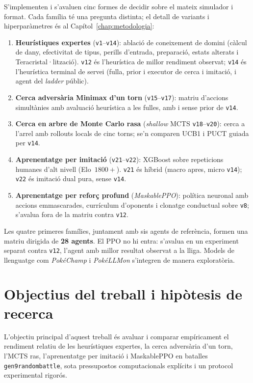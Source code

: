 S'implementen i s'avaluen cinc formes de decidir sobre el mateix simulador i format. Cada família té una pregunta distinta; el detall de variants i hiperparàmetres és al Capítol~\ref{chap:metodologia}:
\begin{enumerate}
    \item \textbf{Heurístiques expertes} (\texttt{v1}--\texttt{v14}): ablació de coneixement de domini (càlcul de dany, efectivitat de tipus, perills d'entrada, preparació, estats alterats i Teracristal·lització). \texttt{v12} és l'heurística de millor rendiment observat; \texttt{v14} és l'heurística terminal de servei (fulla, prior i executor de cerca i imitació, i agent del \emph{ladder} públic).
    \item \textbf{Cerca adversària Minimax d'un torn} (\texttt{v15}--\texttt{v17}): matriu d'accions simultànies amb avaluació heurística a les fulles, amb i sense prior de \texttt{v14}.
    \item \textbf{Cerca en arbre de Monte Carlo rasa} (\emph{shallow} MCTS \texttt{v18}--\texttt{v20}): cerca a l'arrel amb rollouts locals de cinc torns; se'n comparen UCB1 i PUCT guiada per \texttt{v14}.
    \item \textbf{Aprenentatge per imitació} (\texttt{v21}--\texttt{v22}): XGBoost sobre repeticions humanes d'alt nivell (Elo~$1800+$). \texttt{v21} és híbrid (macro apres, micro \texttt{v14}); \texttt{v22} és imitació dual pura, sense \texttt{v14}.
    \item \textbf{Aprenentatge per reforç profund} (\emph{MaskablePPO}): política neuronal amb accions emmascarades, currículum d'oponents i clonatge conductual sobre \texttt{v8}; s'avalua fora de la matriu contra \texttt{v12}.
\end{enumerate}

Les quatre primeres famílies, juntament amb sis agents de referència, formen una matriu dirigida de \textbf{28 agents}. El PPO no hi entra: s'avalua en un experiment separat contra \texttt{v12}, l'agent amb millor resultat observat a la lliga. Models de llenguatge com \textit{PokéChamp} i \textit{PokéLLMon} s'integren de manera exploratòria.

\section{Objectius del treball i hipòtesis de recerca}
\label{sec:objectius}

L'objectiu principal d'aquest treball és avaluar i comparar empíricament el rendiment relatiu de les heurístiques expertes, la cerca adversària d'un torn, l'MCTS ras, l'aprenentatge per imitació i MaskablePPO en batalles \texttt{gen9randombattle}, sota pressupostos computacionals explícits i un protocol experimental rigorós.

